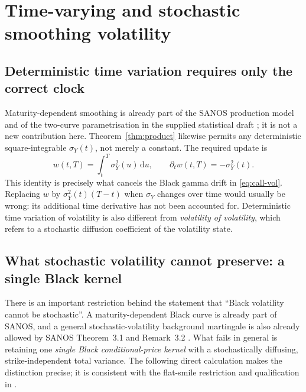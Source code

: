 \documentclass[11pt,a4paper]{article}
\numberwithin{equation}{section}
\theoremstyle{definition}\newtheorem{definition}[theorem]{Definition}
\theoremstyle{remark}\newtheorem{remark}[theorem]{Remark}
\newcommand{\dd}{\,\mathrm d}\newcommand{\dt}{\,\mathrm dt}
\begin{document}
\section{Time-varying and stochastic smoothing volatility}
\label{sec:stochY}
\subsection{Deterministic time variation requires only the correct clock}
Maturity-dependent smoothing is already part of the SANOS production model and of the two-curve parametrisation in the supplied statistical draft \cite{SANOS,DYSANOSv2}; it is not a new contribution here. Theorem~\ref{thm:product} likewise permits any deterministic square-integrable $\sigma_Y(t)$, not merely a constant. The required update is
\[
 w(t,T)=\int_t^T\sigma_Y^2(u)\dd u,
 \qquad \partial_tw(t,T)=-\sigma_Y^2(t).
\]
This identity is precisely what cancels the Black gamma drift in \eqref{eq:call-vol}. Replacing $w$ by $\sigma_Y^2(t)(T-t)$ when $\sigma_Y$ changes over time would usually be wrong: its additional time derivative has not been accounted for. Deterministic time variation of volatility is also different from \emph{volatility of volatility}, which refers to a stochastic diffusion coefficient of the volatility state.

\subsection{What stochastic volatility cannot preserve: a single Black kernel}
\label{sec:black-rigidity}
There is an important restriction behind the statement that ``Black volatility cannot be stochastic''. A maturity-dependent Black curve is already part of SANOS, and a general stochastic-volatility background martingale is also already allowed by SANOS Theorem~3.1 and Remark~3.2 \cite{SANOS}. What fails in general is retaining one \emph{single Black conditional-price kernel} with a stochastically diffusing, strike-independent total variance. The following direct calculation makes the distinction precise; it is consistent with the flat-smile restriction and qualification in \cite[Proposition~3.6 and Remark~3.7]{SSVI}.
\end{document}
